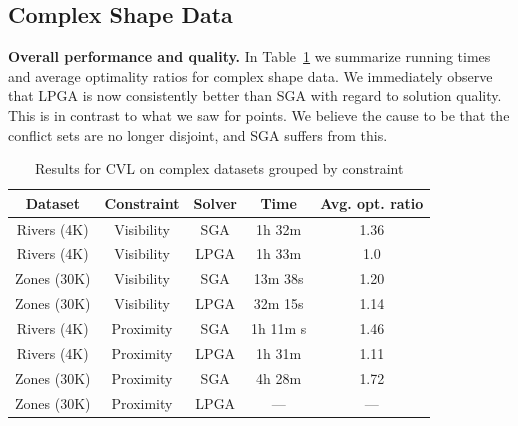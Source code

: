 \documentclass[11pt, oneside]{report}
\newcommand{\minisec}[1]{\noindent\textbf{#1.}}
\begin{document}
{%


\subsection{Complex Shape Data}
\label{sec:exp:complex:shapes}

\minisec{Overall performance and quality}
In Table~\ref{tab:complex:overview} we summarize running times and average optimality ratios for complex shape data. We immediately observe that LPGA is now consistently better than SGA with regard to solution quality. This is in contrast to what we saw for points. We believe the cause to be that the conflict sets are no longer disjoint, and SGA suffers from this.

\begin{table}[htdp]
\caption{Results for CVL on complex datasets grouped by constraint}
\begin{center}
\begin{tabular}{|c|c|c|c|c|}
\hline
\textbf{Dataset} & \textbf{Constraint} & \textbf{Solver} & \textbf{Time} & \textbf{Avg. opt. ratio}\\ 
\hline
Rivers (4K) & Visibility & SGA & 1h 32m & 1.36 \\
Rivers (4K) & Visibility & LPGA & 1h 33m & 1.0 \\
Zones (30K) & Visibility & SGA & 13m 38s & 1.20 \\
Zones (30K) & Visibility & LPGA & 32m 15s & 1.14 \\
\hline
Rivers (4K)  & Proximity  & SGA& 1h 11m s & 1.46 \\
Rivers (4K)  & Proximity & LPGA & 1h 31m & 1.11 \\
Zones (30K) & Proximity & SGA & 4h 28m & 1.72 \\
Zones (30K) & Proximity & LPGA & --- & --- \\
\hline
\end{tabular}
\end{center}
\label{tab:complex:overview}
\end{table}%

}
\end{document}
